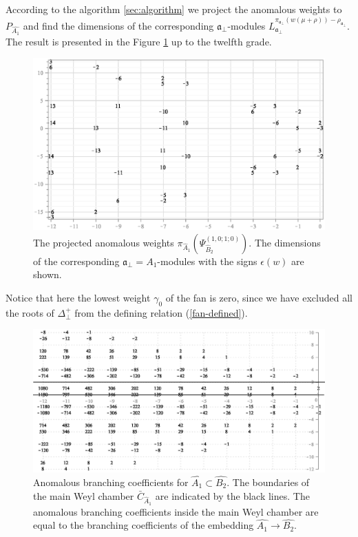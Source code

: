 \documentclass[12pt]{iopart}
\theoremstyle{definition}
\begin{document}
According to the algorithm \ref{sec:algorithm} we project the anomalous weights to
$P_{\hat{A_1}}$ and find the dimensions of the corresponding
$\mathfrak{a}_{\bot}$-modules $L^{\pi_{\mathfrak{a}_{\bot}}(w(\mu+\rho))-\rho_{\mathfrak{a}_{\bot}}}_{\mathfrak{a}_{\bot}}$.
The result is presented in the Figure
\ref{fig:AffineB2_A1_anom_proj} up to the twelfth grade.
\begin{figure}[h!tb]
  \centering
  \includegraphics[width=120mm]{figure12.eps}
  \caption{The projected anomalous weights $\pi_{\hat A_1}\left(\Psi^{(1,0;1;0)}_{\hat B_2}\right)$. The dimensions of the corresponding $\mathfrak{a}_{\bot}=A_1$-modules with the signs $\epsilon(w)$ are shown.}
  \label{fig:AffineB2_A1_anom_proj}
\end{figure}

Notice that here the lowest weight  $\gamma_0$ of the fan  is zero, since we have excluded all the roots of $\Delta^{+}_{\bot}$ from the defining relation (\ref{fan-defined}).

\begin{figure}[h!bt]
  \centering
  \includegraphics[width=120mm]{figure13.eps}
  \caption{Anomalous branching coefficients for $\hat{A_1}\subset \hat{B_2}$.  The boundaries  of the main Weyl chamber $\bar{C}_{\hat{A}_1}$
 are indicated by the black lines. The anomalous branching coefficients inside the main Weyl chamber are equal to the branching coefficients of the embedding $\hat{A_1}\longrightarrow \hat{B_2}$.}
  \label{fig:AffineB2_A1_branching}
\end{figure}
\end{document}
